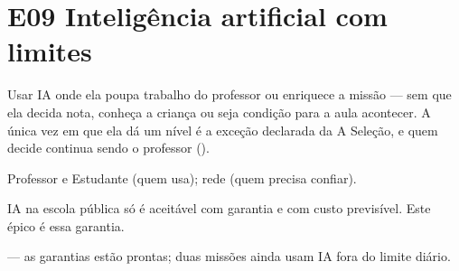 \chapter{E09 \textperiodcentered{} Inteligência artificial com limites}
\label{ep:e09}

\begin{fichaepico}
\begin{campos}
  \item[Objetivo] Usar IA onde ela poupa trabalho do professor ou enriquece a
    missão --- sem que ela decida nota, conheça a criança ou seja condição
    para a aula acontecer. A única vez em que ela dá um nível é a exceção
    declarada da A Seleção, e quem decide continua sendo o professor
    ().
  \item[Para quem] Professor e Estudante (quem usa); rede (quem precisa
    confiar).
  \item[Valor] IA na escola pública só é aceitável com garantia e com custo
    previsível. Este épico é essa garantia.
  \item[Estado] \parcial{} --- as garantias estão prontas; duas missões ainda
    usam IA fora do limite diário.
\end{campos}
\end{fichaepico}

